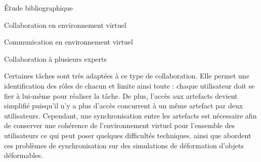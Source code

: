 \documentclass[myfrancais,ngerman,english,frenchb]{mythesis}
\begin{document}
\begin{mychapter}{Étude bibliographique}
\begin{mysection}{Collaboration en environnement virtuel}
\begin{mysubsection}{Communication en environnement virtuel}
\begin{mysubsubsection}{Collaboration à plusieurs experts}
\begin{myfigure}
\begin{myps}
						\end{myps}
						\let\arraystretch\oldarraystretch
					\end{myfigure}

					Certaines tâches sont très adaptées à ce type de collaboration.
					Elle permet une identification des rôles de chacun et limite ainsi toute  : chaque utilisateur doit se fier à lui-même pour réaliser la tâche.
					De plus, l'accès aux artefacts devient simplifié puisqu'il n'y a plus d'accès concurrent à un même artefact par deux utilisateurs.
					Cependant, une synchronisation entre les artefacts est nécessaire afin de conserver une cohérence de l'environnement virtuel pour l'ensemble des utilisateurs ce qui peut poser quelques difficultés techniques.
					 ainsi que  abordent ces problèmes de synchronisation sur des simulations de déformation d'objets déformables.


\end{mysubsubsection}
\end{mysubsection}
\end{mysection}
\end{mychapter}
\end{document}

